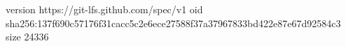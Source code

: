 version https://git-lfs.github.com/spec/v1
oid sha256:137f690c57176f31cacc5c2e6ece27588f37a37967833bd422e87e67d92584c3
size 24336
